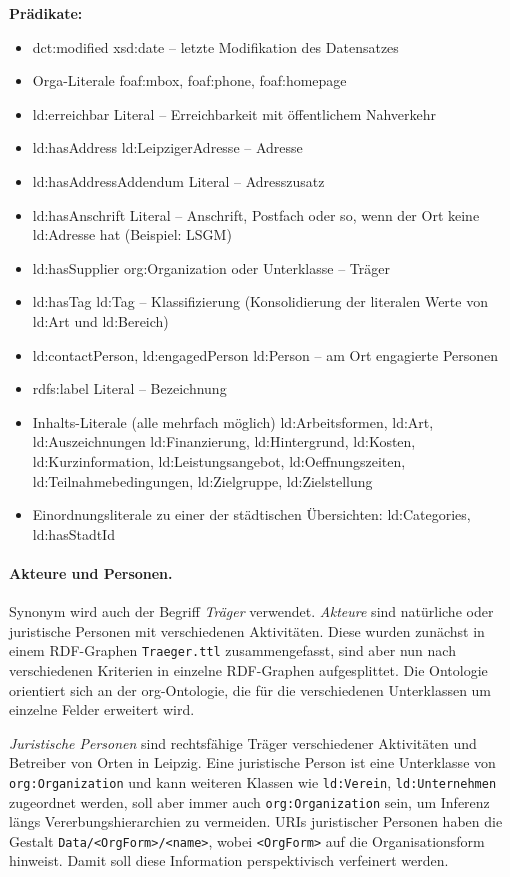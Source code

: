 \documentclass[a4paper,11pt]{article}
\begin{document}
\textbf{Prädikate:}
\begin{itemize}\itemsep0pt
\item dct:modified xsd:date – letzte Modifikation des Datensatzes
\item Orga-Literale foaf:mbox, foaf:phone, foaf:homepage
\item ld:erreichbar Literal – Erreichbarkeit mit öffentlichem Nahverkehr
\item ld:hasAddress ld:LeipzigerAdresse – Adresse
\item ld:hasAddressAddendum Literal – Adresszusatz
\item ld:hasAnschrift Literal – Anschrift, Postfach oder so, wenn der Ort
  keine ld:Adresse hat (Beispiel: LSGM)
\item ld:hasSupplier org:Organization oder Unterklasse – Träger
\item ld:hasTag ld:Tag – Klassifizierung (Konsolidierung der literalen Werte
  von ld:Art und ld:Bereich)
\item ld:contactPerson, ld:engagedPerson ld:Person – am Ort engagierte
  Personen
\item rdfs:label Literal – Bezeichnung
\item Inhalts-Literale (alle mehrfach möglich) ld:Arbeitsformen, ld:Art,
  ld:Auszeichnungen ld:Finanzierung, ld:Hintergrund, ld:Kosten,
  ld:Kurzinformation, ld:Leistungsangebot, ld:Oeffnungszeiten,
  ld:Teilnahmebedingungen, ld:Zielgruppe, ld:Zielstellung
\item Einordnungsliterale zu einer der städtischen Übersichten: ld:Categories,
  ld:hasStadtId
\end{itemize}

\paragraph{Akteure und Personen.} 
Synonym wird auch der Begriff \emph{Träger} verwendet. \emph{Akteure} sind
natürliche oder juristische Personen mit verschiedenen Aktivitäten. Diese
wurden zunächst in einem RDF-Graphen \texttt{Traeger.ttl} zusammengefasst,
sind aber nun nach verschiedenen Kriterien in einzelne RDF-Graphen
aufgesplittet.  Die Ontologie orientiert sich an der org-Ontologie, die für
die verschiedenen Unterklassen um einzelne Felder erweitert wird.

\emph{Juristische Personen} sind rechtsfähige Träger verschiedener Aktivitäten
und Betreiber von Orten in Leipzig. Eine juristische Person ist eine
Unterklasse von \texttt{org:Organization} und kann weiteren Klassen wie
\texttt{ld:Verein}, \texttt{ld:Unternehmen} zugeordnet werden, soll aber immer
auch \texttt{org:Organization} sein, um Inferenz längs Vererbungshierarchien
zu vermeiden. URIs juristischer Personen haben die Gestalt
\texttt{Data/<OrgForm>/<name>}, wobei \texttt{<OrgForm>} auf die
Organisationsform hinweist. Damit soll diese Information perspektivisch
verfeinert werden.
\end{document}
